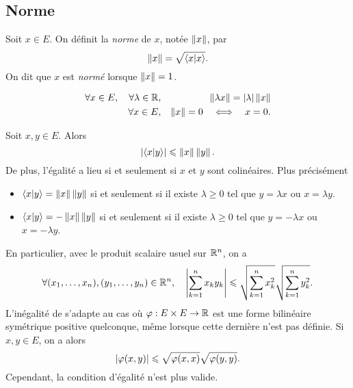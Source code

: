 \documentclass{magnolia}
\begin{document}
\subsection{Norme}

\begin{definition}[utile=-3]
Soit $x\in E$. On définit la \emph{norme} de $x$, notée $\left\|x\right\|$, par
\[\left\|x\right\|=\sqrt{\left\langle {x}\middle|{x}\right\rangle}.\]
On dit que $x$ est \emph{normé} lorsque $\left\|x\right\|=1$.
\end{definition}

\begin{proposition}[utile=-3]
\begin{eqnarray*}
\forall x\in E ,\quad \forall\lambda\in\mathbb{R}, & & \left\|\lambda x\right\|=
  \left|\lambda\right|\left\|x\right\|\\
\forall x\in E, & & \left\|x\right\|=0 \quad\Longleftrightarrow\quad x=0.
\end{eqnarray*}
\end{proposition}

\begin{proposition}[utile=3, nom=Inégalité de \nom{Cauchy-Schwarz}]
Soit $x,y\in E$. Alors
\[\left|\left\langle {x}\middle|{y}\right\rangle\right|\leqslant\left\|x\right\|\left\|y\right\|.\]
De plus, l'égalité a lieu si et seulement si $x$ et $y$ sont colinéaires.  Plus précisément
\begin{itemize}
\item $\left\langle {x}\middle|{y}\right\rangle=\left\|x\right\|\left\|y\right\|$ si et seulement si il existe $\lambda\geq 0$ tel que
$y=\lambda x$ ou $x=\lambda y$.
\item $\left\langle {x}\middle|{y}\right\rangle=-\left\|x\right\|\left\|y\right\|$ si et seulement si il existe
$\lambda\geq 0$ tel que $y=-\lambda x$  ou $x=-\lambda y$.
\end{itemize}
\end{proposition}

\begin{remarques}
\remarque En particulier, avec le produit scalaire usuel sur $\mathbb{R}^n$, on a
  \[\forall (x_1,\ldots,x_n),(y_1,\ldots,y_n)\in\mathbb{R}^n,\quad
    \left|\sum_{k=1}^n x_k y_k\right| \leqslant \sqrt{\sum_{k=1}^n x_k^2}\sqrt{\sum_{k=1}^n y_k^2}.\]
\remarque L'inégalité de  s'adapte au cas où $\varphi:E\times E\to\mathbb{R}$
  est une forme bilinéaire symétrique positive quelconque, même lorsque cette
  dernière n'est pas définie. Si $x,y\in E$, on a alors
  \[\left|\varphi(x,y)\right|\leqslant\sqrt{\varphi(x,x)}\sqrt{\varphi(y,y)}.\]
  Cependant, la condition d'égalité n'est plus valide.
\end{remarques}
\end{document}
